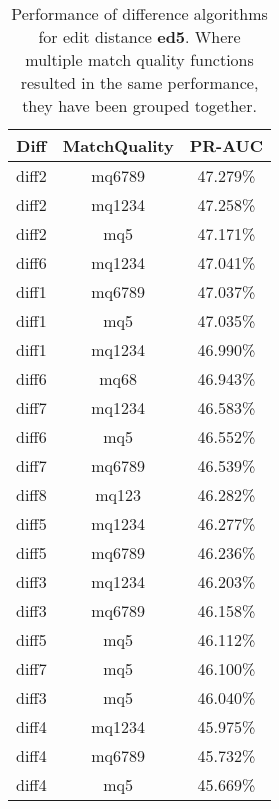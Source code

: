 \begin{table}[tbph]
\begin{center}
\begin{tabular}{|c|c||c|}
\hline
Diff & MatchQuality & PR-AUC  \\
\hline
\hline
diff2 & mq6789 & 47.279\% \\
diff2 & mq1234 & 47.258\% \\
diff2 & mq5 & 47.171\% \\
diff6 & mq1234 & 47.041\% \\
diff1 & mq6789 & 47.037\% \\
diff1 & mq5 & 47.035\% \\
diff1 & mq1234 & 46.990\% \\
diff6 & mq68 & 46.943\% \\
diff7 & mq1234 & 46.583\% \\
diff6 & mq5 & 46.552\% \\
diff7 & mq6789 & 46.539\% \\
diff8 & mq123 & 46.282\% \\
diff5 & mq1234 & 46.277\% \\
diff5 & mq6789 & 46.236\% \\
diff3 & mq1234 & 46.203\% \\
diff3 & mq6789 & 46.158\% \\
diff5 & mq5 & 46.112\% \\
diff7 & mq5 & 46.100\% \\
diff3 & mq5 & 46.040\% \\
diff4 & mq1234 & 45.975\% \\
diff4 & mq6789 & 45.732\% \\
diff4 & mq5 & 45.669\% \\
\hline
\end{tabular}
\end{center}
\caption{Performance of difference algorithms for
  edit distance \textbf{ed5}.  Where multiple match
  quality functions resulted in the same performance, they
  have been grouped together.}
\label{tab:editlongbyed5}
\end{table}
